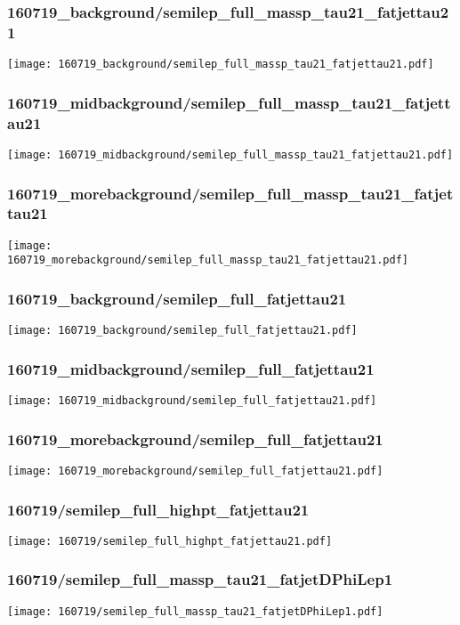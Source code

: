 \begin{frame}
   \frametitle{\small 160719\_background/semilep\_full\_massp\_tau21\_fatjettau21}
   \centering
   \texttt{[image: 160719\_background/semilep\_full\_massp\_tau21\_fatjettau21.pdf]}
\end{frame}

\begin{frame}
   \frametitle{\small 160719\_midbackground/semilep\_full\_massp\_tau21\_fatjettau21}
   \centering
   \texttt{[image: 160719\_midbackground/semilep\_full\_massp\_tau21\_fatjettau21.pdf]}
\end{frame}

\begin{frame}
   \frametitle{\small 160719\_morebackground/semilep\_full\_massp\_tau21\_fatjettau21}
   \centering
   \texttt{[image: 160719\_morebackground/semilep\_full\_massp\_tau21\_fatjettau21.pdf]}
\end{frame}

\begin{frame}
   \frametitle{\small 160719\_background/semilep\_full\_fatjettau21}
   \centering
   \texttt{[image: 160719\_background/semilep\_full\_fatjettau21.pdf]}
\end{frame}

\begin{frame}
   \frametitle{\small 160719\_midbackground/semilep\_full\_fatjettau21}
   \centering
   \texttt{[image: 160719\_midbackground/semilep\_full\_fatjettau21.pdf]}
\end{frame}

\begin{frame}
   \frametitle{\small 160719\_morebackground/semilep\_full\_fatjettau21}
   \centering
   \texttt{[image: 160719\_morebackground/semilep\_full\_fatjettau21.pdf]}
\end{frame}

\begin{frame}
   \frametitle{\small 160719/semilep\_full\_highpt\_fatjettau21}
   \centering
   \texttt{[image: 160719/semilep\_full\_highpt\_fatjettau21.pdf]}
\end{frame}

\begin{frame}
   \frametitle{\small 160719/semilep\_full\_massp\_tau21\_fatjetDPhiLep1}
   \centering
   \texttt{[image: 160719/semilep\_full\_massp\_tau21\_fatjetDPhiLep1.pdf]}
\end{frame}

